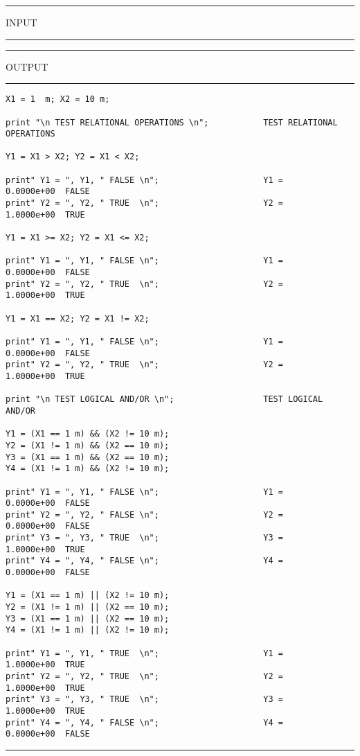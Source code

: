 \vspace{0.15 in}
\begin{footnotesize}
\noindent
\rule{1.2 in}{0.035 in} INPUT \rule{1.2 in}{0.035 in}\hspace{0.1 in}
\rule{1.3 in}{0.035 in} OUTPUT\rule{1.3 in}{0.035 in}
\begin{verbatim}
X1 = 1  m; X2 = 10 m;

print "\n TEST RELATIONAL OPERATIONS \n";           TEST RELATIONAL OPERATIONS 

Y1 = X1 > X2; Y2 = X1 < X2;

print" Y1 = ", Y1, " FALSE \n";                     Y1 =     0.0000e+00  FALSE 
print" Y2 = ", Y2, " TRUE  \n";                     Y2 =     1.0000e+00  TRUE  

Y1 = X1 >= X2; Y2 = X1 <= X2;

print" Y1 = ", Y1, " FALSE \n";                     Y1 =     0.0000e+00  FALSE 
print" Y2 = ", Y2, " TRUE  \n";                     Y2 =     1.0000e+00  TRUE  

Y1 = X1 == X2; Y2 = X1 != X2;

print" Y1 = ", Y1, " FALSE \n";                     Y1 =     0.0000e+00  FALSE 
print" Y2 = ", Y2, " TRUE  \n";                     Y2 =     1.0000e+00  TRUE  

print "\n TEST LOGICAL AND/OR \n";                  TEST LOGICAL AND/OR 

Y1 = (X1 == 1 m) && (X2 != 10 m);
Y2 = (X1 != 1 m) && (X2 == 10 m);
Y3 = (X1 == 1 m) && (X2 == 10 m);
Y4 = (X1 != 1 m) && (X2 != 10 m);

print" Y1 = ", Y1, " FALSE \n";                     Y1 =     0.0000e+00  FALSE 
print" Y2 = ", Y2, " FALSE \n";                     Y2 =     0.0000e+00  FALSE 
print" Y3 = ", Y3, " TRUE  \n";                     Y3 =     1.0000e+00  TRUE  
print" Y4 = ", Y4, " FALSE \n";                     Y4 =     0.0000e+00  FALSE 

Y1 = (X1 == 1 m) || (X2 != 10 m);
Y2 = (X1 != 1 m) || (X2 == 10 m);
Y3 = (X1 == 1 m) || (X2 == 10 m);
Y4 = (X1 != 1 m) || (X2 != 10 m);

print" Y1 = ", Y1, " TRUE  \n";                     Y1 =     1.0000e+00  TRUE  
print" Y2 = ", Y2, " TRUE  \n";                     Y2 =     1.0000e+00  TRUE  
print" Y3 = ", Y3, " TRUE  \n";                     Y3 =     1.0000e+00  TRUE  
print" Y4 = ", Y4, " FALSE \n";                     Y4 =     0.0000e+00  FALSE 
\end{verbatim}
\rule{6.25 in}{0.035 in}
\end{footnotesize}

